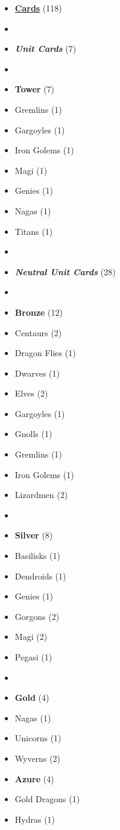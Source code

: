 \begin{multicols}{3}
\begin{itemize}[leftmargin=0pt, label={}, noitemsep]
  \item \textbf{\small{\underline{Cards}}} (118)
  \item
  \item \textbf{\emph{Unit Cards}} (7)
  \item
  \item \textbf{Tower} (7)
  \item Gremlins (1)
  \item Gargoyles (1)
  \item Iron Golems (1)
  \item Magi (1)
  \item Genies (1)
  \item Nagas (1)
  \item Titans (1)
  \item
  \item \textbf{\emph{Neutral Unit Cards}} (28)
  \item
  \item \textbf{Bronze} (12)
  \item Centaurs (2)
  \item Dragon Flies (1)
  \item Dwarves (1)
  \item Elves (2)
  \item Gargoyles (1)
  \item Gnolls (1)
  \item Gremlins (1)
  \item Iron Golems (1)
  \item Lizardmen (2)
  \item
  \item \textbf{Silver} (8)
  \item Basilisks (1)
  \item Dendroids (1)
  \item Genies (1)
  \item Gorgons (2)
  \item Magi (2)
  \item Pegasi (1)
  \item
  \item \textbf{Gold} (4)
  \item Nagas (1)
  \item Unicorns (1)
  \item Wyverns (2)
\columnbreak
  \item \textbf{Azure} (4)
  \item Gold Dragons (1)
  \item Hydras (1)

\end{itemize}
\end{multicols}
